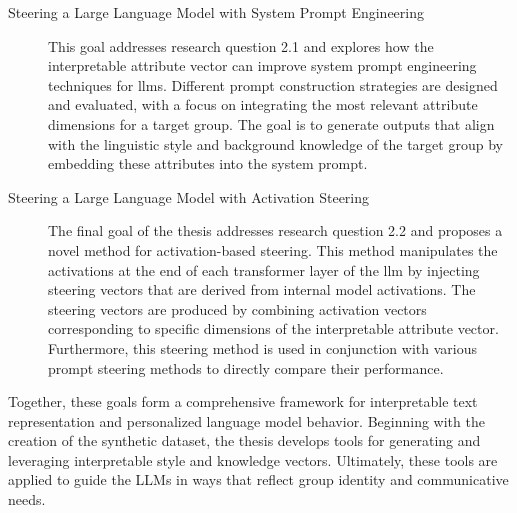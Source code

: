 \begin{description}
  \item[Steering a Large Language Model with System Prompt Engineering]\hspace{\maxstretch}
        This goal addresses research question 2.1 and explores how the interpretable attribute vector can improve system prompt engineering techniques for \acp{llm}. Different prompt construction strategies are designed and evaluated, with a focus on integrating the most relevant attribute dimensions for a target group. The goal is to generate outputs that align with the linguistic style and background knowledge of the target group by embedding these attributes into the system prompt.

  \item[Steering a Large Language Model with Activation Steering]\hphantom{i}
        The final goal of the thesis addresses research question 2.2 and proposes a novel method for activation-based steering. This method manipulates the activations at the end of each transformer layer of the \ac{llm} by injecting steering vectors that are derived from internal model activations. The steering vectors are produced by combining activation vectors corresponding to specific dimensions of the interpretable attribute vector. Furthermore, this steering method is used in conjunction with various prompt steering methods to directly compare their performance.
\end{description}

Together, these goals form a comprehensive framework for interpretable text representation and personalized language model behavior. Beginning with the creation of the synthetic dataset, the thesis develops tools for generating and leveraging interpretable style and knowledge vectors. Ultimately, these tools are applied to guide the LLMs in ways that reflect group identity and communicative needs.
